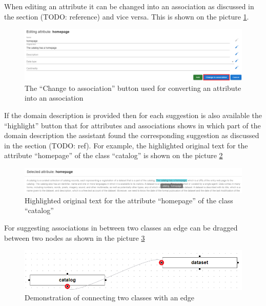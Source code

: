 When editing an attribute it can be changed into an association as discussed in the section (TODO: reference) and vice versa. This is shown on the picture \ref{fig:change_to_association}.

\begin{figure}[!h]
    \includegraphics[scale=0.36]{../docs/images/frontend/change-to-association.png}
    \caption{\centering The ``Change to association'' button used for converting an attribute into an association}
    \label{fig:change_to_association}
\end{figure}

If the domain description is provided then for each suggestion is also available the ``highlight'' button that for attributes and associations shows in which part of the domain description the assistant found the corresponding suggestion as discussed in the section (TODO: ref). For example, the highlighted original text for the attribute ``homepage'' of the class ``catalog'' is shown on the picture \ref{fig:highlight_original_text}

\begin{figure}[!h]
    \includegraphics[scale=0.36]{../docs/images/frontend/highlight-original-text.png}
    \caption{\centering Highlighted original text for the attribute ``homepage'' of the class ``catalog''}
    \label{fig:highlight_original_text}
\end{figure}

For suggesting associations in between two classes an edge can be dragged between two nodes as shown in the picture \ref{fig:edge_drag}

\begin{figure}[!h]
    \includegraphics[scale=0.4]{../docs/images/frontend/edge-drag.png}
    \caption{\centering Demonstration of connecting two classes with an edge}
    \label{fig:edge_drag}
\end{figure}

